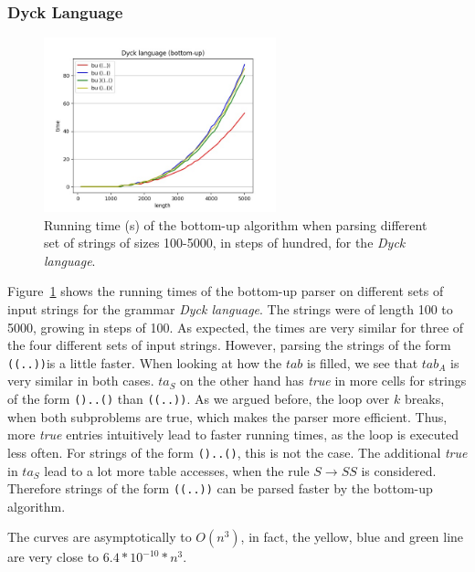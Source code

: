 \subsubsection{Dyck Language}
\label{sec:eval_dyck}

\begin{figure}[!ht]
    \centering
    \includegraphics[width=0.6\textwidth]{Resources/t_dyck_bu.jpg}
    \caption{Running time (s) of the bottom-up algorithm when parsing different set of strings of sizes 100-5000, in steps of hundred, for the \textit{Dyck language}.}
    \label{fig:t_dyck_bu}
\end{figure}

Figure~\cref{fig:t_dyck_bu} shows the running times of the bottom-up parser on different sets of input strings for the grammar \textit{Dyck language}.
The strings were of length 100 to 5000, growing in steps of 100.
As expected, the times are very similar for three of the four different sets of input strings.
However, parsing the strings of the form \texttt{\texttt{((..))}}is a little faster.
When looking at how the $tab$ is filled, we see that $tab_A$ is very similar in both cases.
$ta_S$ on the other hand has \textit{true} in more cells for strings of the form \texttt{()..()} than \texttt{((..))}.
As we argued before, the loop over $k$ breaks, when both subproblems are true, which makes the parser more efficient.
Thus, more \textit{true} entries intuitively lead to faster running times, as the loop is executed less often.
For strings of the form \texttt{()..()}, this is not the case.
The additional \textit{true} in $ta_S$ lead to a lot more table accesses, when the rule $S\rightarrow SS$ is considered.
Therefore strings of the form \texttt{\texttt{((..))}} can be parsed faster by the bottom-up algorithm.

The curves are asymptotically to $O(n^3)$, in fact, the yellow, blue and green line are very close to $6.4*10^{-10}*n^3$.

